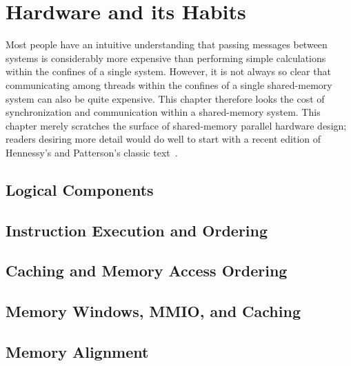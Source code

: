 
\chapter{Hardware and its Habits}
\label{chp:Hardware and its Habits}


Most people have an intuitive understanding that passing messages between
systems is considerably more expensive than performing simple calculations
within the confines of a single system.
However, it is not always so clear that communicating among threads within
the confines of a single shared-memory system can also be quite expensive.
This chapter therefore looks the cost of synchronization and communication
within a shared-memory system.
This chapter merely scratches the surface of shared-memory parallel
hardware design; readers desiring more detail would do well to start
with a recent edition of
Hennessy's and Patterson's classic text~\cite{Hennessy95a}.



\section{Logical Components}
\label{sec:cpu:Logical Components}

\section{Instruction Execution and Ordering}
\label{sec:cpu:Instruction Execution and Ordering}

\section{Caching and Memory Access Ordering}
\label{sec:cpu:Caching and Memory Access Ordering}

\section{Memory Windows, MMIO, and Caching}
\label{sec:cpu:Memory Windows, MMIO, and Caching}

\section{Memory Alignment}
\label{sec:cpu:Memory Alignment}
